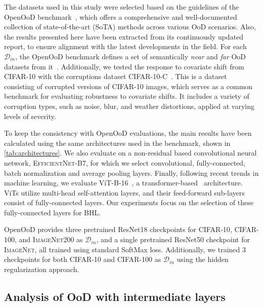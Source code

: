 \documentclass[10pt,twocolumn,a4paper]{article}
\newcommand{\minisection}[1]{\vspace{0.03in} \noindent {\bf #1}}
\begin{document}
\minisection{Datasets.} The datasets used in this study were selected based on the guidelines of the OpenOoD benchmark~\cite{zhang2024openood}, which offers a comprehensive and well-documented collection of state-of-the-art (SoTA) methods across various OoD scenarios. Also, the results presented here have been extracted from its continuously updated report, to ensure alignment with the latest developments in the field. For each $\mathcal{D}_{in}$, the OpenOoD benchmark defines a set of semantically \textit{near} and \textit{far} OoD datasets from it~. Additionally, we tested the response to covariate shift from \textsc{CIFAR-10} with the corruptions dataset \mbox{\textsc{CIFAR-10-C}}~\cite{hendrycks2018benchmarking}.
This is a dataset consisting of corrupted versions of \textsc{CIFAR-10} images, which serves as a common benchmark for evaluating robustness to covariate shifts. It includes a variety of corruption types, such as noise, blur, and weather distortions, applied at varying levels of severity. 

\minisection{Architectures.} To keep the consistency with OpenOoD evaluations, the main results have been calculated using the same architectures used in the benchmark, shown in \cref{tab:architectures}. We also evaluate on a non-residual based convolutional neural network, \textsc{EfficientNet-B7}, for which we select convolutional, fully-connected, batch normalization and average pooling layers. Finally, following recent trends in machine learning, we evaluate ViT-B-16~\cite{dosovitskiy2021an}, a transformer-based~\cite{waswani2017attention} architecture. ViTs utilize multi-head self-attention layers, and their feed-forward sub-layers consist of fully-connected layers. Our experiments focus on the selection of these fully-connected layers for BHL.

\minisection{Training.} 
OpenOoD provides three pretrained ResNet18 checkpoints for \textsc{CIFAR-10}, \textsc{CIFAR-100}, and \textsc{ImageNet200} as $\mathcal{D}_{in}$, and a single pretrained ResNet50 checkpoint for \textsc{ImageNet}, all trained using standard SoftMax loss.
Additionally, we trained 3 checkpoints for both \textsc{CIFAR-10} and \textsc{CIFAR-100} as $\mathcal{D}_{in}$ using the hidden regularization approach.

\subsection{Analysis of OoD with intermediate layers}
\label{sec:analysis}
\end{document}
